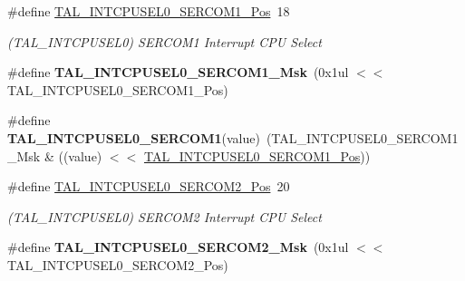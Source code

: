 \begin{DoxyCompactItemize}
\item 
\hypertarget{group___s_a_m_l21___t_a_l_ga7b4941825d55fe193330d49961b0a4f9}{}\#define \hyperlink{group___s_a_m_l21___t_a_l_ga7b4941825d55fe193330d49961b0a4f9}{T\+A\+L\+\_\+\+I\+N\+T\+C\+P\+U\+S\+E\+L0\+\_\+\+S\+E\+R\+C\+O\+M1\+\_\+\+Pos}~18\label{group___s_a_m_l21___t_a_l_ga7b4941825d55fe193330d49961b0a4f9}

\begin{DoxyCompactList}\small\item\em (T\+A\+L\+\_\+\+I\+N\+T\+C\+P\+U\+S\+E\+L0) S\+E\+R\+C\+O\+M1 Interrupt C\+P\+U Select \end{DoxyCompactList}\item 
\hypertarget{group___s_a_m_l21___t_a_l_gae4697f4734b8633e01851a47d3cbc8fa}{}\#define {\bfseries T\+A\+L\+\_\+\+I\+N\+T\+C\+P\+U\+S\+E\+L0\+\_\+\+S\+E\+R\+C\+O\+M1\+\_\+\+Msk}~(0x1ul $<$$<$ T\+A\+L\+\_\+\+I\+N\+T\+C\+P\+U\+S\+E\+L0\+\_\+\+S\+E\+R\+C\+O\+M1\+\_\+\+Pos)\label{group___s_a_m_l21___t_a_l_gae4697f4734b8633e01851a47d3cbc8fa}

\item 
\hypertarget{group___s_a_m_l21___t_a_l_gafb0af810e9ecf9c3c0f91dd07413ddf0}{}\#define {\bfseries T\+A\+L\+\_\+\+I\+N\+T\+C\+P\+U\+S\+E\+L0\+\_\+\+S\+E\+R\+C\+O\+M1}(value)~(T\+A\+L\+\_\+\+I\+N\+T\+C\+P\+U\+S\+E\+L0\+\_\+\+S\+E\+R\+C\+O\+M1\+\_\+\+Msk \& ((value) $<$$<$ \hyperlink{group___s_a_m_l21___t_a_l_ga7b4941825d55fe193330d49961b0a4f9}{T\+A\+L\+\_\+\+I\+N\+T\+C\+P\+U\+S\+E\+L0\+\_\+\+S\+E\+R\+C\+O\+M1\+\_\+\+Pos}))\label{group___s_a_m_l21___t_a_l_gafb0af810e9ecf9c3c0f91dd07413ddf0}

\item 
\hypertarget{group___s_a_m_l21___t_a_l_gab940875b11125589ba7a4ee48e0bd5ab}{}\#define \hyperlink{group___s_a_m_l21___t_a_l_gab940875b11125589ba7a4ee48e0bd5ab}{T\+A\+L\+\_\+\+I\+N\+T\+C\+P\+U\+S\+E\+L0\+\_\+\+S\+E\+R\+C\+O\+M2\+\_\+\+Pos}~20\label{group___s_a_m_l21___t_a_l_gab940875b11125589ba7a4ee48e0bd5ab}

\begin{DoxyCompactList}\small\item\em (T\+A\+L\+\_\+\+I\+N\+T\+C\+P\+U\+S\+E\+L0) S\+E\+R\+C\+O\+M2 Interrupt C\+P\+U Select \end{DoxyCompactList}\item 
\hypertarget{group___s_a_m_l21___t_a_l_ga121b6dd1775237a869bfd08e8a4aa53c}{}\#define {\bfseries T\+A\+L\+\_\+\+I\+N\+T\+C\+P\+U\+S\+E\+L0\+\_\+\+S\+E\+R\+C\+O\+M2\+\_\+\+Msk}~(0x1ul $<$$<$ T\+A\+L\+\_\+\+I\+N\+T\+C\+P\+U\+S\+E\+L0\+\_\+\+S\+E\+R\+C\+O\+M2\+\_\+\+Pos)\label{group___s_a_m_l21___t_a_l_ga121b6dd1775237a869bfd08e8a4aa53c}


\end{DoxyCompactItemize}
